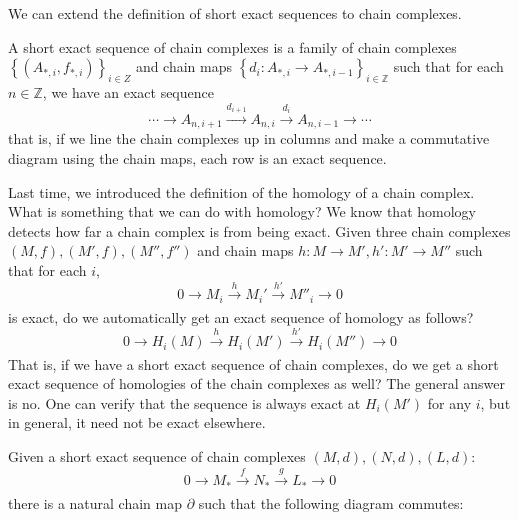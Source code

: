 \documentclass[12pt,reqno]{amsart}
\numberwithin{theorem}{section}
\theoremstyle{definition}
\theoremstyle{remark}
\numberwithin{equation}{section}
\newcommand{\Z}{\mathbb Z}
\newcommand{\set}[1]{\left \{ #1 \right \}}
\newcommand{\del}{\partial}
\theoremstyle{definition}
\begin{document}
We can extend the definition of short exact sequences to chain complexes.
\begin{definition}
    A short exact sequence of chain complexes is a family of chain complexes $\set{(A_{*,i},f_{*,i})}_{i \in Z}$ and chain maps $\set{d_i:A_{*,i}\rightarrow A_{*,i-1}}_{i \in \Z}$ such that for each $n \in \Z$, we have an exact sequence
    $$\cdots \rightarrow A_{n,i+1} \xrightarrow{d_{i+1}}A_{n,i}\xrightarrow{d_i}A_{n,i-1}\rightarrow \cdots$$
    that is, if we line the chain complexes up in columns and make a commutative diagram using the chain maps, each row is an exact sequence.
\end{definition}
Last time, we introduced the definition of the homology of a chain complex. What is something that we can do with homology? We know that homology detects how far a chain complex is from being exact. Given three chain complexes $(M,f),(M',f),(M'',f'')$ and chain maps $h:M \rightarrow M', h':M' \rightarrow M''$ such that for each $i$,
$$0 \rightarrow M_i \xrightarrow[]{h}M_i' \xrightarrow[]{h'} M''_i \rightarrow 0$$
is exact, do we automatically get an exact sequence of homology as follows?
$$0 \rightarrow H_i(M) \xrightarrow[]{h}H_i(M') \xrightarrow[]{h'} H_i(M'') \rightarrow 0$$
That is, if we have a short exact sequence of chain complexes, do we get a short exact sequence of homologies of the chain complexes as well? The general answer is no. One can verify that the sequence is always exact at $H_i(M')$ for any $i$, but in general, it need not be exact elsewhere.
\begin{theorem}
    Given a short exact sequence of chain complexes $(M,d),(N,d),(L,d)$:
    $$ 0 \rightarrow M_* \xrightarrow[]{f} N_*\xrightarrow[]{g}L_*\rightarrow 0$$
    there is a natural chain map $\del $ such that the following diagram commutes:
    \begin{center}
    \end{center}
\end{theorem}
\end{document}
